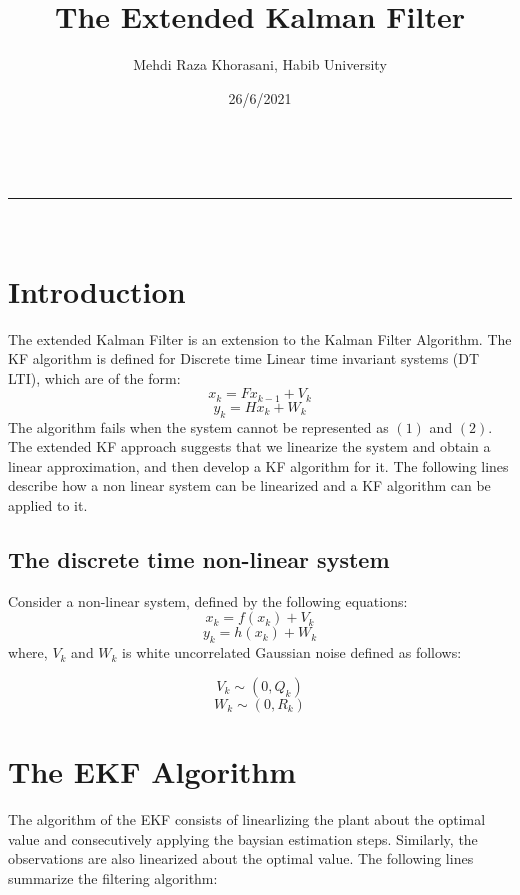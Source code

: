 \documentclass[a4paper,11pt]{article}
\makeatletter
\newcommand{\linia}{\rule{\linewidth}{0.5pt}}
\theoremstyle{mytheor}
\renewcommand{\maketitle}{
\begin{center}
\vspace{2ex}
{\huge \textsc{\@title}}
\vspace{1ex}
\\
\linia\\
\@author \hfill \@date
\vspace{4ex}
\end{center}
}
\makeatother
\begin{document}
\title{The Extended Kalman Filter}

\author{Mehdi Raza Khorasani, Habib University}

\date{26/6/2021}

\maketitle

\section*{Introduction}
The extended Kalman Filter is an extension to the Kalman Filter Algorithm. The KF algorithm is defined for Discrete time Linear time invariant systems (DT LTI), which are of the form: 
\begin{equation}
    x_k = Fx_{k-1} + V_k 
\end{equation}
\begin{equation}
    y_k = Hx_{k} + W_k 
\end{equation}
The algorithm fails when the system cannot be represented as $(1)$ and $(2)$. The extended KF approach suggests that we linearize the system and obtain a linear approximation, and then develop a KF algorithm for it. The following lines describe how a non linear system can be linearized and a KF algorithm can be applied to it.
\subsection*{The discrete time non-linear system}
Consider a non-linear system, defined by the following equations: 
\begin{equation}
    x_k = f(x_k) + V_k 
\end{equation}
\begin{equation}
    y_k = h(x_{k}) + W_k
\end{equation}
where, $V_k$ and $W_k$ is white uncorrelated Gaussian noise defined as follows: 

\begin{equation*}
    V_k \sim (0, Q_k)
\end{equation*}
\begin{equation*}
    W_k \sim (0, R_k)
\end{equation*}

\section*{The EKF Algorithm}
The algorithm of the EKF consists of linearlizing the plant about the optimal value and consecutively applying the baysian estimation steps. Similarly, the observations are also linearized about the optimal value. The following lines summarize the filtering algorithm: 
\end{document}
